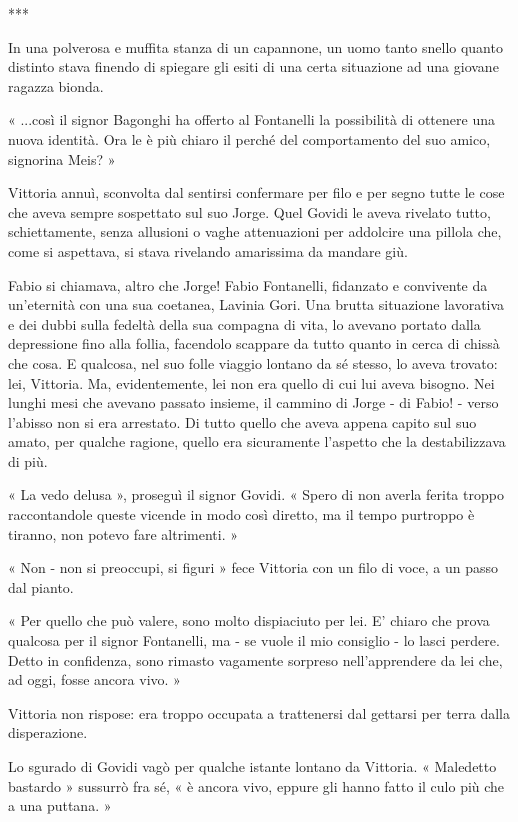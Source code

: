 ***

In una polverosa e muffita stanza di un capannone, un uomo tanto snello quanto distinto stava finendo di spiegare gli esiti di una certa situazione ad una giovane ragazza bionda.

« ...così il signor Bagonghi ha offerto al Fontanelli la possibilità di ottenere una nuova identità. Ora le è più chiaro il perché del comportamento del suo amico, signorina Meis? »

Vittoria annuì, sconvolta dal sentirsi confermare per filo e per segno tutte le cose che aveva sempre sospettato sul suo Jorge. Quel Govidi le aveva rivelato tutto, schiettamente, senza allusioni o vaghe attenuazioni per addolcire una pillola che, come si aspettava, si stava rivelando amarissima da mandare giù.

Fabio si chiamava, altro che Jorge! Fabio Fontanelli, fidanzato e convivente da un'eternità con una sua coetanea, Lavinia Gori. Una brutta situazione lavorativa e dei dubbi sulla fedeltà della sua compagna di vita, lo avevano portato dalla depressione fino alla follia, facendolo scappare da tutto quanto in cerca di chissà che cosa. E qualcosa, nel suo folle viaggio lontano da sé stesso, lo aveva trovato: lei, Vittoria. Ma, evidentemente, lei non era quello di cui lui aveva bisogno. Nei lunghi mesi che avevano passato insieme, il cammino di Jorge - di Fabio! - verso l'abisso non si era arrestato. Di tutto quello che aveva appena capito sul suo amato, per qualche ragione, quello era sicuramente l'aspetto che la destabilizzava di più.

« La vedo delusa », proseguì il signor Govidi. « Spero di non averla ferita troppo raccontandole queste vicende in modo così diretto, ma il tempo purtroppo è tiranno, non potevo fare altrimenti. »

« Non - non si preoccupi, si figuri » fece Vittoria con un filo di voce, a un passo dal pianto.

« Per quello che può valere, sono molto dispiaciuto per lei. E' chiaro che prova qualcosa per il signor Fontanelli, ma - se vuole il mio consiglio - lo lasci perdere. Detto in confidenza, sono rimasto vagamente sorpreso nell'apprendere da lei che, ad oggi, fosse ancora vivo. »

Vittoria non rispose: era troppo occupata a trattenersi dal gettarsi per terra dalla disperazione.

Lo sgurado di Govidi vagò per qualche istante lontano da Vittoria. « Maledetto bastardo » sussurrò fra sé, « è ancora vivo, eppure gli hanno fatto il culo più che a una puttana. »

